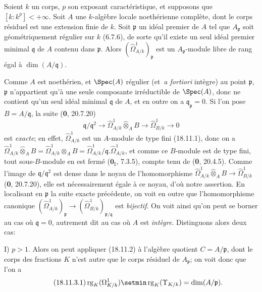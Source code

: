 \begin{lemma}[18.11.3]
\label{IV.18.11.3}
Soient $k$ un corps, $p$ son exposant caractéristique, et supposons que $[k:k^p]<+\infty$. Soit $A$ une $k$-algèbre locale noethérienne \textup{complète}, dont le corps résiduel est une extension \textup{finie} de $k$. Soit $\mathfrak p$ un idéal premier de $A$ tel que $A_{\mathfrak p}$ soit \textup{géométriquement régulier} sur $k$ \textup{(6.7.6)}, de sorte qu'il existe un seul idéal premier minimal $\mathfrak q$ de $A$ contenu dans $\mathfrak p$. Alors $(\hat{\Omega}^1_{A/k})_{\mathfrak p}$ est un $A_{\mathfrak p}$-module libre de rang égal à $\dim(A/\mathfrak q)$.
\end{lemma}

Comme $A$ est noethérien, et $\Spec(A)$ régulier (et \,\emph{a fortiori} intègre) au point $\mathfrak p$, $\mathfrak p$ n'appartient qu'à une seule composante irréductible de $\Spec(A)$, donc ne contient
qu'un seul idéal minimal $\mathfrak q$ de $A$, et en outre on a $\mathfrak q_{\mathfrak p}=0$. Si l'on pose $B=A/\mathfrak q$, la suite (\textbf{0}, 20.7.20)
\[
  \mathfrak q/\mathfrak q^2\longrightarrow
  \hat{\Omega}^1_{A/k}\widehat{\otimes}_A B
  \longrightarrow\hat{\Omega}^1_{B/k}\longrightarrow0
\]
est \emph{exacte}; en effet, $\hat{\Omega}^1_{A/k}$ est un $A$-module de type fini (18.11.1), donc on a $\hat{\Omega}^1_{A/k}\widehat{\otimes}_A B=\hat{\Omega}^1_{A/k}\otimes_A B=\hat{\Omega}^1_{A/k}/\mathfrak q.\hat{\Omega}^1_{A/k}$, et comme ce $B$-module est de type fini, tout sous-$B$-module en est fermé ($\mathbf{0}_{\mathrm I}$, 7.3.5), compte tenu de (\textbf{0}, 20.4.5). Comme l'image de $\mathfrak q/\mathfrak q^2$ est dense dans le noyau de l'homomorphisme $\hat{\Omega}^1_{A/k}\widehat{\otimes}_A B\to\hat{\Omega}^1_{B/k}$ (\textbf{0}, 20.7.20), elle est nécessairement égale à ce noyau, d'où notre assertion. En localisant en $\mathfrak p$ la suite exacte précédente, on voit en outre que l'homomorphisme canonique $(\hat{\Omega}^1_{A/k})_{\mathfrak p}\to(\hat{\Omega}^1_{B/k})_{\mathfrak p/\mathfrak q}$ est \emph{bijectif}. On voit ainsi qu'on peut se borner au cas où $\mathfrak q=0$, autrement dit au cas où $A$ est \emph{intègre}. Distinguons alors deux cas:

I) $p>1$. Alors on peut appliquer (18.11.2) à l'algèbre quotient $C=A/\mathfrak p$, dont le corps des fractions $K$ n'est autre que le corps résiduel de $A_{\mathfrak p}$; on voit donc que l'on a
\begin{equation}
\label{IV.18.11.3.1}
\tag{18.11.3.1}
  \operatorname{rg}_K(\Omega^1_{K/k})\setmin\operatorname{rg}_K(\Upsilon_{K/k})=\dim(A/\mathfrak p).
\end{equation}

